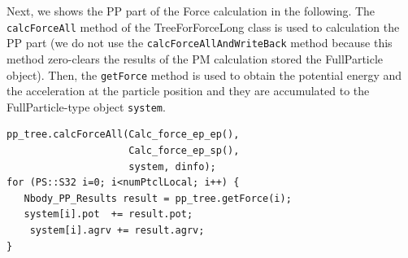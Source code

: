 Next, we shows the PP part of the Force calculation in the following. The \texttt{calcForceAll} method of the \textsf{TreeForForceLong} class is used to calculation the PP part (we do not use the \texttt{calcForceAllAndWriteBack} method because this method zero-clears the results of the PM calculation stored the \textsf{FullParticle} object). Then, the \texttt{getForce} method is used to obtain the potential energy and the acceleration at the particle position and they are accumulated to the \textsf{FullParticle}-type object \texttt{system}.
\begin{lstlisting}[caption=PP part of Force calculation]
pp_tree.calcForceAll(Calc_force_ep_ep(),
                     Calc_force_ep_sp(),
                     system, dinfo);
for (PS::S32 i=0; i<numPtclLocal; i++) {
   Nbody_PP_Results result = pp_tree.getForce(i);
   system[i].pot  += result.pot;
    system[i].agrv += result.agrv;
}
\end{lstlisting}
\endifCpp

